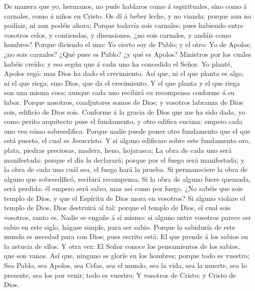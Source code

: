  De manera que yo, hermanos, no pude hablaros como á
espirituales, sino como á carnales, como á niños en Cristo. 
Os dí á beber leche, y no vianda: porque aun no podíais, ni aun podéis
ahora;  Porque todavía sois carnales: pues habiendo entre
vosotros celos, y contiendas, y disensiones, ¿no sois carnales, y andáis
como hombres?  Porque diciendo el uno: Yo cierto soy de
Pablo; y el otro: Yo de Apolos; ¿no sois carnales?  ¿Qué
pues es Pablo? ¿y qué es Apolos? Ministros por los cuales habéis creído;
y eso según que á cada uno ha concedido el Señor.  Yo
planté, Apolos regó: mas Dios ha dado el crecimiento.  Así
que, ni el que planta es algo, ni el que riega; sino Dios, que da el
crecimiento.  Y el que planta y el que riega son una misma
cosa; aunque cada uno recibirá su recompensa conforme á su labor.
 Porque nosotros, coadjutores somos de Dios; y vosotros
labranza de Dios sois, edificio de Dios sois.  Conforme á
la gracia de Dios que me ha sido dada, yo como perito arquitecto puse el
fundamento, y otro edifica encima: empero cada uno vea cómo
sobreedifica.  Porque nadie puede poner otro fundamento que
el que está puesto, el cual es Jesucristo.  Y si alguno
edificare sobre este fundamento oro, plata, piedras preciosas, madera,
heno, hojarasca;  La obra de cada uno será manifestada:
porque el día la declarará; porque por el fuego será manifestada; y la
obra de cada uno cuál sea, el fuego hará la prueba.  Si
permaneciere la obra de alguno que sobreedificó, recibirá recompensa.
 Si la obra de alguno fuere quemada, será perdida: él
empero será salvo, mas así como por fuego.  ¿No sabéis que
sois templo de Dios, y que el Espíritu de Dios mora en vosotros?
 Si alguno violare el templo de Dios, Dios destruirá al
tal: porque el templo de Dios, el cual sois vosotros, santo es.
 Nadie se engañe á sí mismo: si alguno entre vosotros
parece ser sabio en este siglo, hágase simple, para ser sabio.
 Porque la sabiduría de este mundo es necedad para con
Dios; pues escrito está: El que prende á los sabios en la astucia de
ellos.  Y otra vez: El Señor conoce los pensamientos de los
sabios, que son vanos.  Así que, ninguno se gloríe en los
hombres; porque todo es vuestro;  Sea Pablo, sea Apolos,
sea Cefas, sea el mundo, sea la vida, sea la muerte, sea lo presente,
sea los por venir; todo es vuestro;  Y vosotros de Cristo;
y Cristo de Dios.

